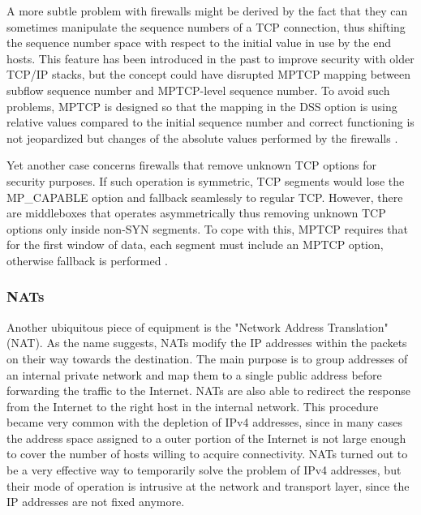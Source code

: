A more subtle problem with firewalls might be derived by the fact that they can sometimes manipulate the sequence numbers of a TCP connection, thus shifting the sequence number space with respect to the initial value in use by the end hosts. This feature has been introduced in the past to improve security with older TCP/IP stacks, but the concept could have disrupted MPTCP mapping between subflow sequence number and MPTCP-level sequence number. To avoid such problems, MPTCP is designed so that the mapping in the DSS option is using relative values compared to the initial sequence number and correct functioning is not jeopardized but changes of the absolute values performed by the firewalls \cite{2014:2578508}.

Yet another case concerns firewalls that remove unknown TCP options for security purposes. If such operation is symmetric, TCP segments would lose the MP\_CAPABLE option and fallback seamlessly to regular TCP. However, there are middleboxes that operates asymmetrically thus removing unknown TCP options only inside non-SYN segments. To cope with this, MPTCP requires that for the first window of data, each segment must include an MPTCP option, otherwise fallback is performed \cite{HDPDB13}.

\subsubsection{NATs}
Another ubiquitous piece of equipment is the "Network Address Translation" (NAT). As the name suggests, NATs modify the IP addresses within the packets on their way towards the destination. The main purpose is to group addresses of an internal private network and map them to a single public address before forwarding the traffic to the Internet. NATs are also able to redirect the response from the Internet to the right host in the internal network.
This procedure became very common with the depletion of IPv4 addresses, since in many cases the address space assigned to a outer portion of the Internet is not large enough to cover the number of hosts willing to acquire connectivity. 
NATs turned out to be a very effective way to temporarily solve the problem of IPv4 addresses, but their mode of operation is intrusive at the network and transport layer, since the IP addresses are not fixed anymore.

